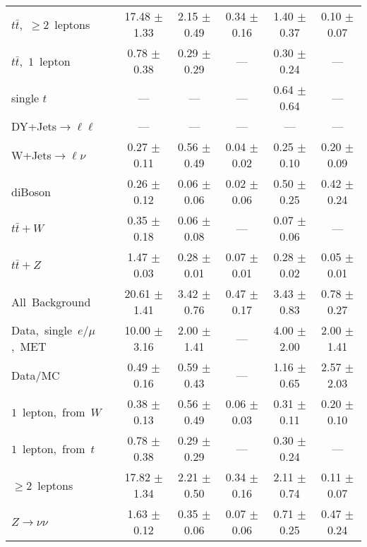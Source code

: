 \documentclass{article}
\begin{document}
\begin{longtable}{|l|c|c|c|c|c|}
$t\bar{t}$,~$\ge2$~leptons & 17.48 $\pm$ 1.33  & 2.15 $\pm$ 0.49  & 0.34 $\pm$ 0.16  & 1.40 $\pm$ 0.37  & 0.10 $\pm$ 0.07 \\* 
$t\bar{t}$,~$1$~lepton & 0.78 $\pm$ 0.38  & 0.29 $\pm$ 0.29  & ---  & 0.30 $\pm$ 0.24  & --- \\* 
single $t$  & ---  & ---  & ---  & 0.64 $\pm$ 0.64  & --- \\* 
DY+Jets$\rightarrow\ell\ell$  & ---  & ---  & ---  & ---  & --- \\* 
W+Jets$\rightarrow\ell\nu$  & 0.27 $\pm$ 0.11  & 0.56 $\pm$ 0.49  & 0.04 $\pm$ 0.02  & 0.25 $\pm$ 0.10  & 0.20 $\pm$ 0.09 \\* 
diBoson  & 0.26 $\pm$ 0.12  & 0.06 $\pm$ 0.06  & 0.02 $\pm$ 0.06  & 0.50 $\pm$ 0.25  & 0.42 $\pm$ 0.24 \\* 
$t\bar{t}+W$  & 0.35 $\pm$ 0.18  & 0.06 $\pm$ 0.08  & ---  & 0.07 $\pm$ 0.06  & --- \\* 
$t\bar{t}+Z$  & 1.47 $\pm$ 0.03  & 0.28 $\pm$ 0.01  & 0.07 $\pm$ 0.01  & 0.28 $\pm$ 0.02  & 0.05 $\pm$ 0.01 \\* 
\hline \hline 
All~Background  & 20.61 $\pm$ 1.41  & 3.42 $\pm$ 0.76  & 0.47 $\pm$ 0.17  & 3.43 $\pm$ 0.83  & 0.78 $\pm$ 0.27 \\* 
Data,~single~$e/\mu$,~MET  & 10.00 $\pm$ 3.16  & 2.00 $\pm$ 1.41  & ---  & 4.00 $\pm$ 2.00  & 2.00 $\pm$ 1.41 \\* 
Data/MC  & 0.49 $\pm$ 0.16  & 0.59 $\pm$ 0.43  & ---  & 1.16 $\pm$ 0.65  & 2.57 $\pm$ 2.03 \\* 
\hline \hline 
$1$~lepton,~from~$W$  & 0.38 $\pm$ 0.13  & 0.56 $\pm$ 0.49  & 0.06 $\pm$ 0.03  & 0.31 $\pm$ 0.11  & 0.20 $\pm$ 0.10 \\* 
$1$~lepton,~from~$t$  & 0.78 $\pm$ 0.38  & 0.29 $\pm$ 0.29  & ---  & 0.30 $\pm$ 0.24  & --- \\* 
$\ge2$~leptons  & 17.82 $\pm$ 1.34  & 2.21 $\pm$ 0.50  & 0.34 $\pm$ 0.16  & 2.11 $\pm$ 0.74  & 0.11 $\pm$ 0.07 \\* 
$Z\rightarrow\nu\nu$  & 1.63 $\pm$ 0.12  & 0.35 $\pm$ 0.06  & 0.07 $\pm$ 0.06  & 0.71 $\pm$ 0.25  & 0.47 $\pm$ 0.24 \\* 
\hline 
\end{longtable} 

 
 
 
 
\pagebreak 

 
 
 
 
\end{document}
